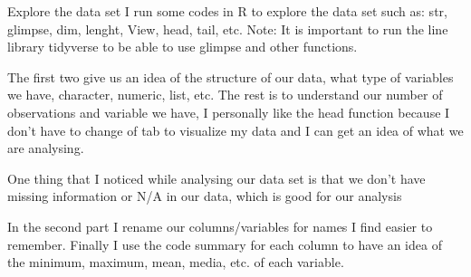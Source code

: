 \documentclass[12pt,letterpaper]{article}
\begin{document}
	Explore the data set
	I run some codes in R to explore the data set such as: str, glimpse, dim, lenght, View, head, tail, etc.
	Note: It is important to run the line library tidyverse to be able to use glimpse and other functions. 
	
	The first two give us an idea of the structure of our data, what type of variables we have, character, numeric, list, etc.
	The rest is to understand our number of observations and variable we have, I personally like the head function because I don't have to change of tab to visualize my data and I can get an idea of what we are analysing. 
	
	One thing that I noticed while analysing our data set is that we don't have missing information or N/A in our data, which is good for our analysis
	
	In the second part I rename our columns/variables for names I find easier to remember. Finally I use the code summary for each column to have an idea of the minimum, maximum, mean, media, etc. of each variable. 	
	
\end{document}

